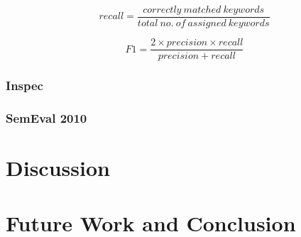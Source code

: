 \documentclass[conference]{IEEEtran}
\begin{document}
\begin{equation}
recall = \frac{correctly \ matched \ keywords}{total \ no. \ of \ assigned \ keywords}
\label{recall}
\end{equation}

\begin{equation}
F1 = \frac{2\times precision\times recall}{precision + recall}
\label{f1}
\end{equation}



\subsubsection{Inspec \label{inspec}}

\subsubsection{SemEval 2010 \label{semeval}}

\section{Discussion \label{discussion}}

\section{Future Work and Conclusion \label{conclusion}}



%
%
\end{document}
